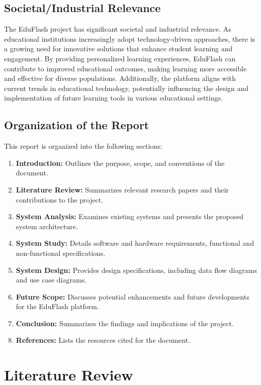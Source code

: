 \documentclass{report}
\begin{document}
\section{Societal/Industrial Relevance}
The EduFlash project has significant societal and industrial relevance. As educational institutions increasingly adopt technology-driven approaches, there is a growing need for innovative solutions that enhance student learning and engagement. By providing personalized learning experiences, EduFlash can contribute to improved educational outcomes, making learning more accessible and effective for diverse populations. Additionally, the platform aligns with current trends in educational technology, potentially influencing the design and implementation of future learning tools in various educational settings.

\section{Organization of the Report}
This report is organized into the following sections:
\begin{enumerate}
    \item \textbf{Introduction:} Outlines the purpose, scope, and conventions of the document.
    \item \textbf{Literature Review:} Summarizes relevant research papers and their contributions to the project.
    \item \textbf{System Analysis:} Examines existing systems and presents the proposed system architecture.
    \item \textbf{System Study:} Details software and hardware requirements, functional and non-functional specifications.
    \item \textbf{System Design:} Provides design specifications, including data flow diagrams and use case diagrams.
    \item \textbf{Future Scope:} Discusses potential enhancements and future developments for the EduFlash platform.
    \item \textbf{Conclusion:} Summarizes the findings and implications of the project.
    \item \textbf{References:} Lists the resources cited for the document.
\end{enumerate}




\newpage
\pagestyle{fancy}
\fancyhf{}
\lhead{}
\chapter{Literature Review}
\end{document}
